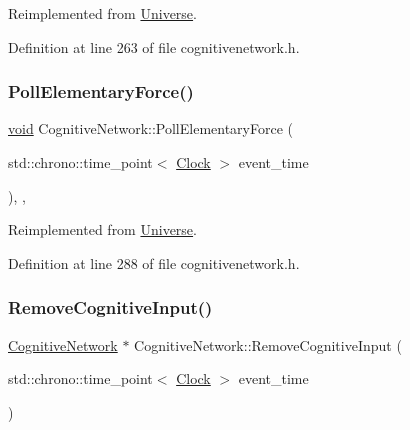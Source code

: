 Reimplemented from \mbox{\hyperlink{class_universe_a645299738e6b798a037f2a15a2e7cf4d}{Universe}}.



Definition at line 263 of file cognitivenetwork.\+h.

\mbox{\label{class_cognitive_network_ac97c08a0af7dc0d02fbe059827b6be87}} 
\subsubsection{\texorpdfstring{Poll\+Elementary\+Force()}{PollElementaryForce()}}
{\footnotesize\ttfamily \mbox{\hyperlink{glad_8h_a950fc91edb4504f62f1c577bf4727c29}{void}} Cognitive\+Network\+::\+Poll\+Elementary\+Force (\begin{DoxyParamCaption}\item[{std\+::chrono\+::time\+\_\+point$<$ \mbox{\hyperlink{universe_8h_a0ef8d951d1ca5ab3cfaf7ab4c7a6fd80}{Clock}} $>$}]{event\+\_\+time }\end{DoxyParamCaption})\hspace{0.3cm}{\ttfamily [inline]}, {\ttfamily [final]}, {\ttfamily [virtual]}}



Reimplemented from \mbox{\hyperlink{class_universe_a0c485c504542409cbb5cfd8543c35b11}{Universe}}.



Definition at line 288 of file cognitivenetwork.\+h.

\mbox{\label{class_cognitive_network_af79bf7f8b61d5392df7a87bd444eb550}} 
\subsubsection{\texorpdfstring{Remove\+Cognitive\+Input()}{RemoveCognitiveInput()}}
{\footnotesize\ttfamily \mbox{\hyperlink{class_cognitive_network}{Cognitive\+Network}} $\ast$ Cognitive\+Network\+::\+Remove\+Cognitive\+Input (\begin{DoxyParamCaption}\item[{std\+::chrono\+::time\+\_\+point$<$ \mbox{\hyperlink{universe_8h_a0ef8d951d1ca5ab3cfaf7ab4c7a6fd80}{Clock}} $>$}]{event\+\_\+time }\end{DoxyParamCaption})}



